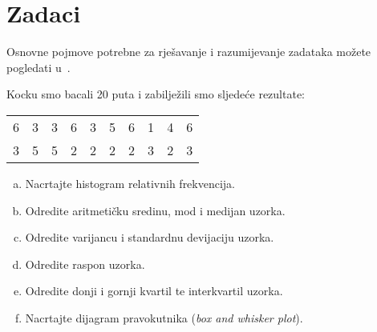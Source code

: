 \documentclass[12pt]{scrartcl}
\begin{document}
\section{Zadaci}
Osnovne pojmove potrebne za rješavanje i razumijevanje zadataka možete pogledati u~\cite{predavanja}.
\begin{zadatak}
Kocku smo bacali 20 puta i zabilježili smo sljedeće rezultate:
\begin{center}
\begin{tabular}{cccccccccc}
6 & 3 & 3 & 6 & 3 & 5 & 6 & 1 & 4 & 6 \\
3 & 5 & 5 & 2 & 2 & 2 & 2 & 3 & 2 & 3
\end{tabular}
\end{center}
\begin{enumerate}[(a)]
    \item Nacrtajte histogram relativnih frekvencija.
    \item Odredite aritmetičku sredinu, mod i medijan uzorka.
    \item Odredite varijancu i standardnu devijaciju uzorka.
    \item  Odredite raspon uzorka.
    \item Odredite donji i gornji kvartil te interkvartil uzorka.
    \item Nacrtajte dijagram pravokutnika (\textsl{box and whisker plot}).
\end{enumerate}
\end{zadatak}
\end{document}
